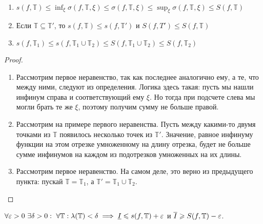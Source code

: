 \documentclass[a4paper]{article}
\theoremstyle{named}
\newcommand{\T}{\mathbb{T}}
\begin{document}
        \begin{lemma*}~

            \begin{enumerate}
            \item
                $s(f, \T) \leq \inf_{\xi} \sigma(f, \T, \xi) \leq \sigma(f, \T, \xi) \leq \sup_{\xi} \sigma(f, \T, \xi) \leq S(f, \T)$

            \item
                Если $\T \subseteq \T'$, то $s(f, \T) \leq s(f, \T')$ и $S(f, T') \leq S(f, \T)$

            \item
                $s(f, \T_1) \leq s(f, \T_1 \cup \T_2) \leq S(f, \T_1 \cup \T_2) \leq S(f, \T_2)$
            \end{enumerate}
        \end{lemma*}

        \begin{proof}~

            \begin{enumerate}
            \item
                Рассмотрим первое неравенство, так как последнее аналогично ему, а те, что между ними, следуют из определения. Логика здесь такая: пусть мы нашли инфинум справа и соответствующий ему $\xi$. Но тогда при подсчете слева мы могли брать те же $\xi$, поэтому получим сумму не больше правой.

            \item
                Рассмотрим на примере первого неравенства. Пусть между какими-то двумя точками из $\T$ появилось несколько точек из $\T'$. Значение, равное инфинуму функции на этом отрезке умноженному на длину отрезка, будет не больше сумме инфинумов на каждом из подотрезков умноженных на их длины.

            \item
                Рассмотрим первое неравенство. На самом деле, это верно из предыдущего пункта: пускай $\T = \T_1$, а $\T' = \T_1 \cup \T_2$.
            \end{enumerate}
        \end{proof}

        \begin{lemma*}
            $\forall \eps > 0 \ \exists \delta > 0: \ \forall \T: \lambda(\T) < \delta \implies \underline{I} \leq s(f, \T) + \eps$ и $\overline{I} \geq S(f, \T) - \eps$.
        \end{lemma*}
\end{document}
